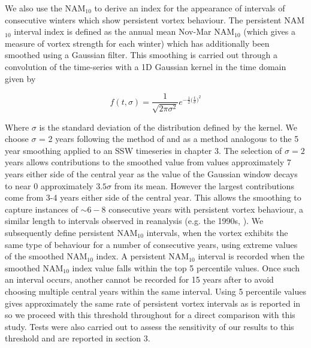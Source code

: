 We also use the NAM$_{10}$ to derive an index for the appearance of intervals of consecutive winters which show persistent vortex behaviour. The persistent NAM$_{10}$ interval index is defined as the annual mean Nov-Mar NAM$_{10}$ (which gives a measure of vortex strength for each winter) which has additionally been smoothed using a Gaussian filter. This smoothing is carried out through a convolution of the time-series with a 1D Gaussian kernel in the time domain given by

\begin{equation} \label{Gaussian_filter}
f(t, \sigma) = \frac{1}{\sqrt{2 \pi \sigma^2}} e^{-\frac{1}{2}\big(\frac{t}{\sigma}\big)^2}
\end{equation}

Where $\sigma$ is the standard deviation of the distribution defined by the kernel. We choose $\sigma$ = 2 years following the method of \cite{reichlerStratospheric2012} and as a method analogous to the 5 year smoothing applied to an SSW timeseries in chapter 3. The selection of $\sigma = 2$ years allows contributions to the smoothed value from values approximately 7 years either side of the central year as the value of the Gaussian window decays to near 0 approximately $3.5\sigma$ from its mean. However the largest contributions come from 3-4 years either side of the central year. This allows the smoothing to capture instances of $\sim 6-8$ consecutive years with persistent vortex behaviour, a similar length to intervals observed in reanalysis (e.g. the 1990s, \cite{pawsonCold1999}). We subsequently define persistent NAM$_{10}$ intervals, when the vortex exhibits the same type of behaviour for a number of consecutive years, using extreme values of the smoothed NAM$_{10}$ index. A persistent NAM$_{10}$ interval is recorded when the smoothed NAM$_{10}$ index value falls within the top 5 percentile values. Once such an interval occurs, another cannot be recorded for 15 years after to avoid choosing multiple central years within the same interval. Using 5 percentile values gives approximately the same rate of persistent vortex intervals as is reported in \cite{reichlerStratospheric2012} so we proceed with this threshold throughout for a direct comparison with this study. Tests were also carried out to assess the sensitivity of our results to this threshold and are reported in section 3.

